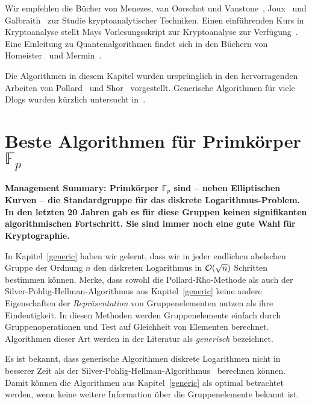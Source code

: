 \begin{refsegment}
Wir empfehlen die Bücher von Menezes, van Oorschot und Vanstone~\cite{Menezes2001}, Joux~\cite{Joux2009} und Galbraith~\cite{Galbraith2012} zur Studie kryptoanalytischer Techniken. Einen einführenden Kurs in Kryptoanalyse stellt Mays Vorlesungsskript zur Kryptoanalyse zur Verfügung~\cite{May2012a,May2012b}. Eine Einleitung zu Quantenalgorithmen findet sich in den Büchern von Homeister~\cite{Homeister2007} und Mermin~\cite{Mermin2008}.

Die Algorithmen in diesem Kapitel wurden ursprünglich in den hervorragenden Arbeiten von Pollard~\cite{Pollard1975,Pollard2000} und Shor~\cite{Shor1994} vorgestellt.
Generische Algorithmen für viele Dlogs wurden kürzlich untersucht in~\cite{multiple2014}.


\newpage
\section{\texorpdfstring{Beste Algorithmen für Primkörper $\mathbb{F}_p$}{Beste Algorithmen für Primkörper Fp}}
\label{prime_field}
{\bf Management Summary: Primkörper $\mathbb{F}_p$ sind -- neben Elliptischen Kurven -- die Standardgruppe für das diskrete Logarithmus-Problem. In den letzten 20 Jahren gab es für diese Gruppen keinen signifikanten algorithmischen Fortschritt. Sie sind immer noch eine gute Wahl für Kryptographie.\\[0.1cm]}

In Kapitel~\ref{generic} haben wir gelernt, dass wir in jeder endlichen abelschen Gruppe der Ordnung $n$ den diskreten Logarithmus in ${\cal O}(\sqrt n)$ Schritten bestimmen können. Merke, dass sowohl die Pollard-Rho-Methode als auch der Silver-Pohlig-Hellman-Algorithmus aus Kapitel~\ref{generic} keine andere Eigenschaften der {\em Repräsentation} von Gruppenelementen nutzen als ihre Eindeutigkeit. In diesen Methoden werden Gruppenelemente einfach durch Gruppenoperationen und Test auf Gleichheit von Elementen berechnet. Algorithmen dieser Art werden in der Literatur als {\em generisch} bezeichnet.

Es ist bekannt, dass generische Algorithmen diskrete Logarithmen nicht in besserer Zeit als der Silver-Pohlig-Hellman-Algorithmus~\cite{Shoup1997} berechnen können. Damit können die Algorithmen aus Kapitel~\ref{generic} als optimal betrachtet werden, wenn keine weitere Information über die Gruppenelemente bekannt ist.


\end{refsegment}
